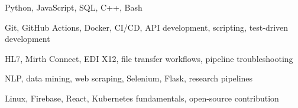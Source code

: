 

\begin{cvskills}

    {Python, JavaScript, SQL, C++, Bash}

    {Git, GitHub Actions, Docker, CI/CD, API development, scripting, test-driven development}

    {HL7, Mirth Connect, EDI X12, file transfer workflows, pipeline troubleshooting}

    {NLP, data mining, web scraping, Selenium, Flask, research pipelines}

    {Linux, Firebase, React, Kubernetes fundamentals, open-source contribution}

\end{cvskills}
